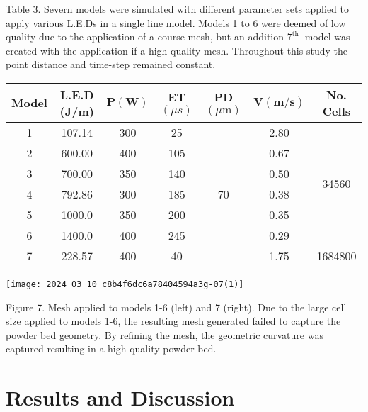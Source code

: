 \documentclass[10pt]{article}
\begin{document}
Table 3. Severn models were simulated with different parameter sets applied to apply various L.E.Ds in a single line model. Models 1 to 6 were deemed of low quality due to the application of a course mesh, but an addition $7^{\text {th }}$ model was created with the application if a high quality mesh. Throughout this study the point distance and time-step remained constant.

\begin{center}
\begin{tabular}{|c|c|c|c|c|c|c|}
\hline
Model & L.E.D (J/m) & $\mathbf{P}(\mathbf{W})$ & ET $(\mu s)$ & PD $(\mu \mathrm{m})$ & $\mathbf{V}(\mathbf{m} / \mathbf{s})$ & No. Cells \\
\hline
1 & 107.14 & 300 & 25 & \multirow{7}{*}{70} & 2.80 & \multirow{6}{*}{34560} \\
\hline
2 & 600.00 & 400 & 105 &  & 0.67 &  \\
\hline
3 & 700.00 & 350 & 140 &  & 0.50 &  \\
\hline
4 & 792.86 & 300 & 185 &  & 0.38 &  \\
\hline
5 & 1000.0 & 350 & 200 &  & 0.35 &  \\
\hline
6 & 1400.0 & 400 & 245 &  & 0.29 &  \\
\hline
7 & 228.57 & 400 & 40 &  & 1.75 & 1684800 \\
\hline
\end{tabular}
\end{center}

\begin{center}
\texttt{[image: 2024\_03\_10\_c8b4f6dc6a78404594a3g-07(1)]}
\end{center}

Figure 7. Mesh applied to models 1-6 (left) and 7 (right). Due to the large cell size applied to models 1-6, the resulting mesh generated failed to capture the powder bed geometry. By refining the mesh, the geometric curvature was captured resulting in a high-quality powder bed.

\section*{Results and Discussion}
\end{document}
